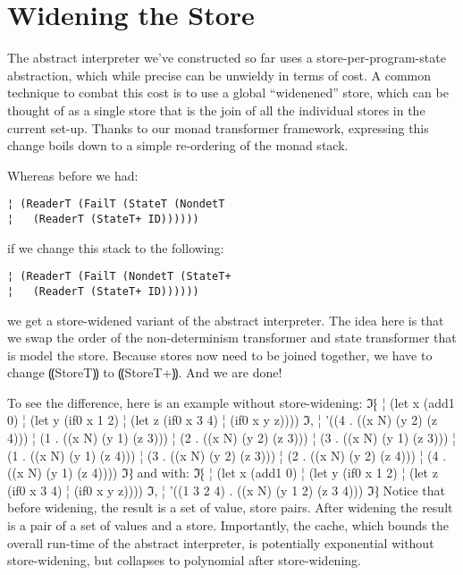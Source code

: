 \section{Widening the Store}\label{s:widening}

The abstract interpreter we've constructed so far uses a
store-per-program-state abstraction, which while precise can be
unwieldy in terms of cost.  A common technique to combat this cost is
to use a global ``widenened'' store, which can be thought of as a
single store that is the join of all the individual stores in the
current set-up.  Thanks to our monad transformer framework, expressing
this change boils down to a simple re-ordering of the monad stack.

Whereas before we had:
\begin{lstlisting}
¦ (ReaderT (FailT (StateT (NondetT
¦   (ReaderT (StateT+ ID))))))
\end{lstlisting}
if we change this stack to the following:
\begin{lstlisting}
¦ (ReaderT (FailT (NondetT (StateT+
¦   (ReaderT (StateT+ ID))))))
\end{lstlisting}
we get a store-widened variant of the abstract interpreter.  The idea
here is that we swap the order of the non-determinism transformer and
state transformer that is model the store.  Because stores now need to
be joined together, we have to change ⸨StoreT⸩ to
⸨StoreT+⸩.  And we are done!

To see the difference, here is an example without store-widening:
ℑ⁅
¦ (let x (add1 0)
¦   (let y (if0 x 1 2)
¦     (let z (if0 x 3 4)
¦       (if0 x y z))))
ℑ,
¦ '((4 . ((x N) (y 2) (z 4)))
¦   (1 . ((x N) (y 1) (z 3)))
¦   (2 . ((x N) (y 2) (z 3)))
¦   (3 . ((x N) (y 1) (z 3)))
¦   (1 . ((x N) (y 1) (z 4)))
¦   (3 . ((x N) (y 2) (z 3)))
¦   (2 . ((x N) (y 2) (z 4)))
¦   (4 . ((x N) (y 1) (z 4))))
ℑ⁆
and with:
ℑ⁅
¦ (let x (add1 0)
¦   (let y (if0 x 1 2)
¦     (let z (if0 x 3 4)
¦       (if0 x y z))))
ℑ,
¦ '((1 3 2 4) . ((x N) (y 1 2) (z 3 4)))
ℑ⁆
Notice that before widening, the result is a set of value, store
pairs.  After widening the result is a pair of a set of values and a
store.  Importantly, the cache, which bounds the overall run-time of
the abstract interpreter, is potentially exponential without
store-widening, but collapses to polynomial after store-widening.
